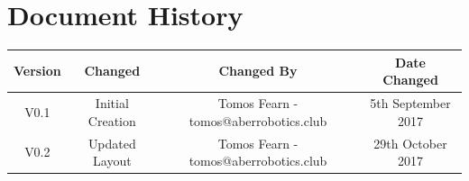\documentclass[a4paper,11pt]{article}
\begin{document}
\section*{Document History}
\begin{center}
\begin{tabular}{ |c|c|c|c| } 
\hline
Version & Changed & Changed By & Date Changed \\
\hline
V0.1 & Initial Creation & Tomos Fearn - tomos@aberrobotics.club & 5th September 2017\\ 
\hline
V0.2 & Updated Layout & Tomos Fearn - tomos@aberrobotics.club & 29th October 2017\\
\hline
\end{tabular}
\end{center}
\end{document}
